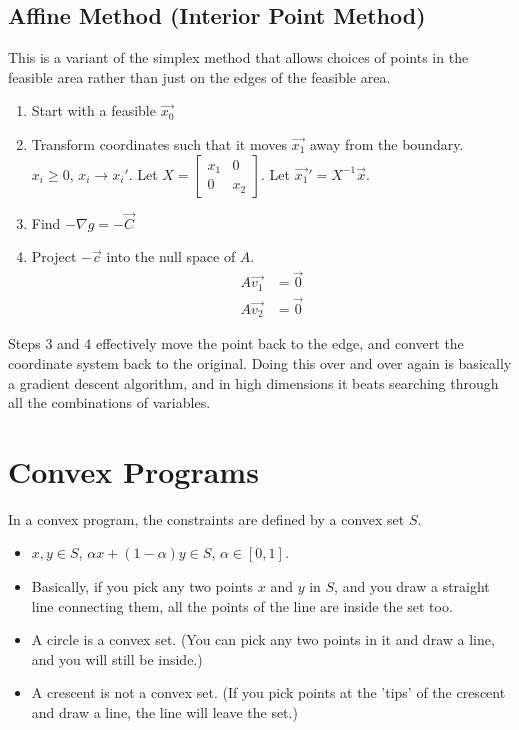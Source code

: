 \documentclass[10pt]{article}
\begin{document}
\subsection*{Affine Method (Interior Point Method)}
This is a variant of the simplex method that allows choices of points in the feasible area rather than just on the edges of the feasible area.
\begin{enumerate}
	\item Start with a feasible $\vec{x_0}$
	\item Transform coordinates such that it moves $\vec{x_1}$ away from the boundary.\\
	      $x_i \geq 0$, $x_i \rightarrow x_i'$.  Let $X = \begin{bmatrix} x_1 & 0 \\ 0 & x_2\end{bmatrix}$.  Let $\vec{x_1}' = X^{-1} \vec{x}$.
	\item Find $-\nabla g = -\vec{C}$
	\item Project $-\vec{c}$ into the null space of $A$.
    \begin{align*}
        A\vec{v_1} &= \vec{0}\\
        A\vec{v_2} &= \vec{0}
    \end{align*}
\end{enumerate}
Steps 3 and 4 effectively move the point back to the edge, and convert the coordinate system back to the original.  Doing this over and over again is basically a gradient descent algorithm, and in high dimensions it beats searching through all the combinations of variables.

\section*{Convex Programs}
In a convex program, the constraints are defined by a convex set $S$.
\begin{itemize}
	\item $x, y \in S$, $\alpha x + (1 - \alpha)y \in S$, $\alpha \in [0, 1]$.
	\item Basically, if you pick any two points $x$ and $y$ in $S$, and you draw a straight line connecting them, all the points of the line are inside the set too.
	\item A circle is a convex set.  (You can pick any two points in it and draw a line, and you will still be inside.)
	\item A crescent is not a convex set.  (If you pick points at the 'tips' of the crescent and draw a line, the line will leave the set.)
\end{itemize}
\end{document}
